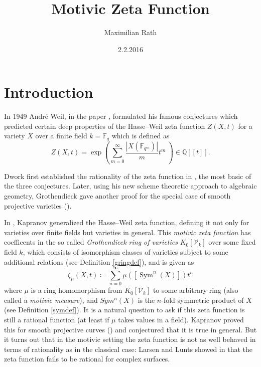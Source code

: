 \documentclass[11pt, a4paper, german]{article}
\author{Maximilian Rath}
\date{2.2.2016}
\title{Motivic Zeta Function}
\theoremstyle{plain}
\newtheorem{theorem}{Theorem}[section]
\theoremstyle{definition}
\newcommand{\gring}[1][k]{K_0[\mathcal{V}_#1]}
\DeclareMathOperator{\Sym}{Sym}
\begin{document}
\maketitle
\tableofcontents
\section{Introduction}

In 1949 Andr\'e Weil, in the paper \cite{weil1949}, formulated his famous conjectures
which predicted certain deep properties of the Hasse--Weil zeta function $Z(X,t)$ for a variety $X$ over a finite field $k = \mathbb{F}_q$ 
which is defined as
\[
    Z(X,t) = \exp \left(\sum_{m=0}^\infty \frac{|X(\mathbb{F}_{q^m})|}{m} t^m \ \right) \in \mathbb{Q}[[t]].
\]

Dwork first established the rationality of the zeta function in \cite{Dwork}, the most basic of the three conjectures. 
Later, using his new scheme theoretic approach to algebraic geometry, Grothendieck gave another proof for the special case of 
smooth projective varieties (\cite{GrRat}).


In \cite{kapranov}, Kapranov generalized the Hasse--Weil zeta function, defining it not only for varieties over finite fields
but varieties in general. This \emph{motivic zeta function} has coefficents in the so called \emph{Grothendieck ring of varieties} $\gring[k]$ 
over some fixed field $k$, 
which consists of isomorphism classes of varieties subject to some additional relations 
(see Definition \ref{gringdef}), and is given as 
\[
    \zeta_{\mu}(X,t) \coloneqq \sum_{n=0}^{\infty} \mu \left( \left[ \Sym^n(X) \right] \right) t^n
\]
where $\mu$ is a ring homomorphism from $\gring[k]$ to some arbitrary ring (also called a \emph{motivic measure}), 
and $Sym^n(X)$ is the $n$-fold symmetric product of $X$ (see Definition \ref{symdef}). 
It is a natural question to ask if this zeta function is still a rational function (at least if $\mu$ takes values in a field).
Kapranov proved this for smooth projective curves (\cite[Thm 1.1.9]{kapranov}) and conjectured that it is true in general.
But it turns out that in the motivic setting the zeta function is not as well behaved in terms of rationality as in the classical case:
Larsen and Lunts showed in \cite{MR1996804} that the zeta function fails to be rational for complex surfaces.
\end{document}
